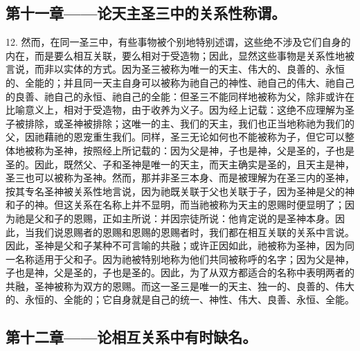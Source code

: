 
\subsection{第十一章——论天主圣三中的关系性称谓。}

12. 然而，在同一圣三中，有些事物被个别地特别述谓，这些绝不涉及它们自身的内在，而是要么相互关联，要么相对于受造物；因此，显然这些事物是关系性地被言说，而非以实体的方式。因为圣三被称为唯一的天主、伟大的、良善的、永恒的、全能的；并且同一天主自身可以被称为祂自己的神性、祂自己的伟大、祂自己的良善、祂自己的永恒、祂自己的全能：但圣三不能同样地被称为父，除非或许在比喻意义上，相对于受造物，由于收养为义子。因为经上记载：这绝不应理解为圣子被排除，或圣神被排除；这唯一的主、我们的天主，我们也正当地称祂为我们的父，因祂藉祂的恩宠重生我们。同样，圣三无论如何也不能被称为子，但它可以整体地被称为圣神，按照经上所记载的：因为父是神，子也是神，父是圣的，子也是圣的。因此，既然父、子和圣神是唯一的天主，而天主确实是圣的，且天主是神，圣三也可以被称为圣神。然而，那并非圣三本身、而是被理解为在圣三内的圣神，按其专名圣神被关系性地言说，因为祂既关联于父也关联于子，因为圣神是父的神和子的神。但这关系在名称上并不显明，而当祂被称为天主的恩赐时便显明了；因为祂是父和子的恩赐，正如主所说：并因宗徒所说：他肯定说的是圣神本身。因此，当我们说恩赐者的恩赐和恩赐的恩赐者时，我们都在相互关联的关系中言说。因此，圣神是父和子某种不可言喻的共融；或许正因如此，祂被称为圣神，因为同一名称适用于父和子。因为祂被特别地称为他们共同被称呼的名字；因为父是神，子也是神，父是圣的，子也是圣的。因此，为了从双方都适合的名称中表明两者的共融，圣神被称为双方的恩赐。而这一圣三是唯一的天主、独一的、良善的、伟大的、永恒的、全能的；它自身就是自己的统一、神性、伟大、良善、永恒、全能。\par


\subsection{第十二章——论相互关系中有时缺名。}

